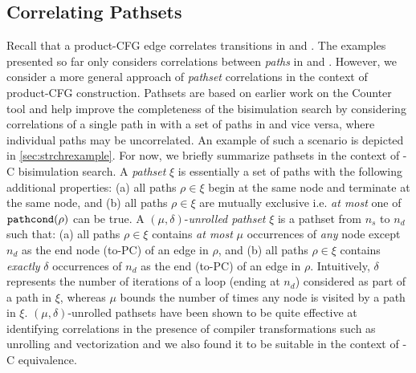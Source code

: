 \subsection{Correlating Pathsets}
\label{sec:pathsetcorrel}
Recall that a product-CFG edge correlates transitions in \sprog{} and \cprog{}.
The examples presented so far only considers correlations between {\em paths} in \sprog{} and \cprog{}.
However, we consider a more general approach of {\em pathset} correlations in the context of product-CFG construction.
Pathsets are based on earlier work on the Counter tool \cite{oopsla20,shubhanipdhthesis}
and help improve the completeness of the bisimulation search by considering correlations of a single path in \cprog{}
with a set of paths in \sprog{} and vice versa, where individual paths may be uncorrelated.
An example of such a scenario is depicted in \cref{sec:strchrexample}.
For now, we briefly summarize pathsets in the context of \SpecL{}-C bisimulation search.
A {\em pathset} $\xi$ is essentially a set of paths with the following additional properties:
(a) all paths $\rho \in \xi$ begin at the same node and terminate at the same node, and
(b) all paths $\rho \in \xi$ are mutually exclusive i.e. {\em at most} one of ${{\tt pathcond}(\rho)}$ can be true.
A $(\mu,\delta)$-{\em unrolled pathset} $\xi$ is a pathset from $n_s$ to $n_d$ such that:
(a) all paths $\rho \in \xi$ contains {\em at most} $\mu$ occurrences of {\em any} node except $n_d$ as the end node (to-PC) of an edge in $\rho$, and
(b) all paths $\rho \in \xi$ contains {\em exactly} $\delta$ occurrences of $n_d$ as the end (to-PC) of an edge in $\rho$.
Intuitively, $\delta$ represents the number of iterations of a loop (ending at $n_d$) considered as part of a path in $\xi$,
whereas $\mu$ bounds the number of times any node is visited by a path in $\xi$.
$(\mu,\delta)$-unrolled pathsets have been shown to be quite effective at identifying correlations in the presence of
compiler transformations such as unrolling and vectorization \cite{shubhanipdhthesis} and we also found it to be
suitable in the context of \SpecL{}-C equivalence.

